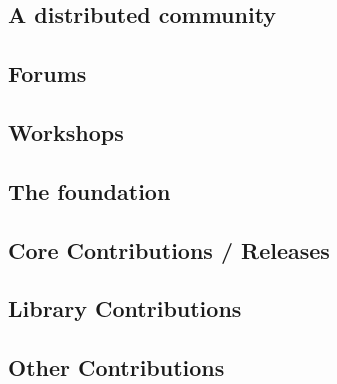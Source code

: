 \subsection{A distributed community}
\subsection{Forums}
\subsection{Workshops}
\subsection{The foundation}
\subsection{Core Contributions / Releases}
\subsection{Library Contributions}
\subsection{Other Contributions}
